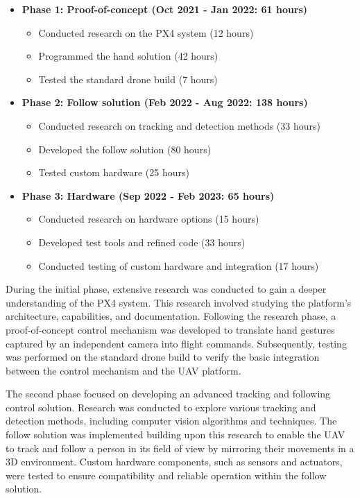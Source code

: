 \begin{itemize}
\item \textbf{Phase 1: Proof-of-concept (Oct 2021 - Jan 2022: 61 hours)}
\begin{itemize}
\item Conducted research on the PX4 system (12 hours)
\item Programmed the hand solution (42 hours)
\item Tested the standard drone build (7 hours)
\end{itemize}

\item \textbf{Phase 2: Follow solution (Feb 2022 - Aug 2022: 138 hours)}
\begin{itemize}
    \item Conducted research on tracking and detection methods (33 hours)
    \item Developed the follow solution (80 hours)
    \item Tested custom hardware (25 hours)
\end{itemize}

\item \textbf{Phase 3: Hardware (Sep 2022 - Feb 2023: 65 hours)}
\begin{itemize}
    \item Conducted research on hardware options (15 hours)
    \item Developed test tools and refined code (33 hours)
    \item Conducted testing of custom hardware and integration (17 hours)
\end{itemize}
\end{itemize}

During the initial phase, extensive research was conducted to gain a deeper understanding of the PX4 system. This research involved studying the platform's architecture, capabilities, and documentation. Following the research phase, a proof-of-concept control mechanism was developed to translate hand gestures captured by an independent camera into flight commands. Subsequently, testing was performed on the standard drone build to verify the basic integration between the control mechanism and the UAV platform.

The second phase focused on developing an advanced tracking and following control solution. Research was conducted to explore various tracking and detection methods, including computer vision algorithms and techniques. The follow solution was implemented building upon this research to enable the UAV to track and follow a person in its field of view by mirroring their movements in a 3D environment. Custom hardware components, such as sensors and actuators, were tested to ensure compatibility and reliable operation within the follow solution.

